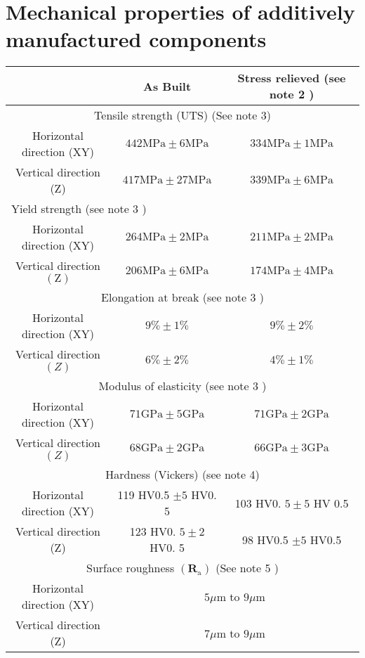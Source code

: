 \documentclass[10pt]{article}
\begin{document}
\section*{Mechanical properties of additively manufactured components}
\begin{center}
\begin{tabular}{|c|c|c|}
\hline
 & As Built & Stress relieved (see note 2 ) \\
\hline
\multicolumn{3}{|c|}{Tensile strength (UTS) (See note 3)} \\
\hline
Horizontal direction (XY) & $442 \mathrm{MPa} \pm 6 \mathrm{MPa}$ & $334 \mathrm{MPa} \pm 1 \mathrm{MPa}$ \\
\hline
Vertical direction (Z) & $417 \mathrm{MPa} \pm 27 \mathrm{MPa}$ & $339 \mathrm{MPa} \pm 6 \mathrm{MPa}$ \\
\hline
\multicolumn{3}{|l|}{Yield strength (see note 3 )} \\
\hline
Horizontal direction (XY) & $264 \mathrm{MPa} \pm 2 \mathrm{MPa}$ & $211 \mathrm{MPa} \pm 2 \mathrm{MPa}$ \\
\hline
Vertical direction $(\mathrm{Z})$ & $206 \mathrm{MPa} \pm 6 \mathrm{MPa}$ & $174 \mathrm{MPa} \pm 4 \mathrm{MPa}$ \\
\hline
\multicolumn{3}{|c|}{Elongation at break (see note 3 )} \\
\hline
Horizontal direction (XY) & $9 \% \pm 1 \%$ & $9 \% \pm 2 \%$ \\
\hline
Vertical direction $(Z)$ & $6 \% \pm 2 \%$ & $4 \% \pm 1 \%$ \\
\hline
\multicolumn{3}{|c|}{Modulus of elasticity (see note 3 )} \\
\hline
Horizontal direction (XY) & $71 \mathrm{GPa} \pm 5 \mathrm{GPa}$ & $71 \mathrm{GPa} \pm 2 \mathrm{GPa}$ \\
\hline
Vertical direction $(Z)$ & $68 \mathrm{GPa} \pm 2 \mathrm{GPa}$ & $66 \mathrm{GPa} \pm 3 \mathrm{GPa}$ \\
\hline
\multicolumn{3}{|c|}{Hardness (Vickers) (see note 4)} \\
\hline
Horizontal direction (XY) & 119 HV0.5 $\pm 5$ HV0. 5 & 103 HV0. $5 \pm 5$ HV 0.5 \\
\hline
Vertical direction (Z) & 123 HV0. $5 \pm 2$ HV0. 5 & 98 HV0.5 $\pm 5$ HV0.5 \\
\hline
\multicolumn{3}{|c|}{Surface roughness $\left(\mathbf{R}_{\mathrm{a}}\right)$ (See note 5 )} \\
\hline
Horizontal direction (XY) & \multicolumn{2}{|c|}{$5 \mu \mathrm{m}$ to $9 \mu \mathrm{m}$} \\
\hline
Vertical direction (Z) & \multicolumn{2}{|c|}{$7 \mu \mathrm{m}$ to $9 \mu \mathrm{m}$} \\
\hline
\end{tabular}
\end{center}
\end{document}
